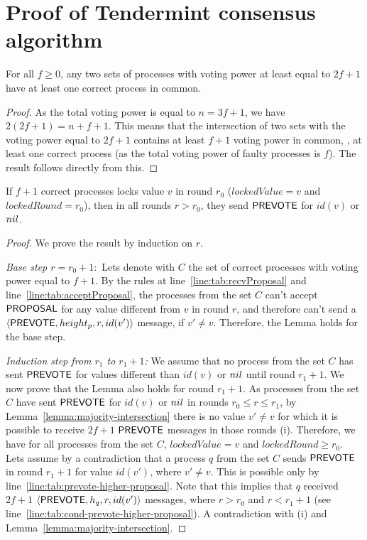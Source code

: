 \section{Proof of Tendermint consensus algorithm}
\label{sec:proof}

\begin{lemma}
	\label{lemma:majority-intersection}
	For all $f\geq 0$, any two sets of processes with voting power at least equal to $2f+1$ have
	at least one correct process in common.
\end{lemma}

\begin{proof}
	As the total voting power is equal to $n=3f+1$, we have $2(2f+1) = n+f+1$.
	This means that the intersection of two sets with the voting power equal to $2f+1$ contains at least $f+1$ voting power in common, \ie, at least one correct process (as the total voting power of faulty processes is $f$). The result follows directly from this.
\end{proof}

\begin{lemma}
	\label{lemma:locked-decision_value-prevote-v}
	If $f+1$ correct processes locks value $v$ in round $r_0$ ($lockedValue = v$ and $lockedRound = r_0$), then in all rounds $r > r_0$, they send $\mathsf{PREVOTE}$ for $id(v)$ or $nil$.
\end{lemma}

\begin{proof}
We prove the result by induction on $r$.

\emph{Base step $r = r_0 + 1:$} Lets denote with $C$ the set of correct processes with voting power equal to $f+1$. 
By the rules at line~\ref{line:tab:recvProposal} and line~\ref{line:tab:acceptProposal}, the processes from the set $C$ can't accept $\mathsf{PROPOSAL}$ for any value different from $v$ in round $r$, and therefore can't send a $\langle\mathsf{PREVOTE},height_p, r,id(v')\rangle$ message,
if $v' \neq v$. Therefore, the Lemma holds for the base step.

\emph{Induction step from $r_1$ to $r_1+1$:} We assume that no process from the set $C$ has sent $\mathsf{PREVOTE}$ for values different than $id(v)$ or $nil$ until round $r_1 + 1$. We now prove that 
the Lemma also holds for round $r_1 + 1$. As processes from the set $C$ have sent $\mathsf{PREVOTE}$ for $id(v)$ or $nil$ in rounds $r_0 \le r \le r_1$, by Lemma~\ref{lemma:majority-intersection}
there is no value $v' \neq v$ for which it is possible to receive $2f+1$ $\mathsf{PREVOTE}$ messages in those rounds (i). Therefore, we have for all processes from the set $C$, $lockedValue = v$ and $lockedRound \ge r_0$.   
Lets assume by a contradiction that a process $q$ from the set $C$ sends $\mathsf{PREVOTE}$ in round $r_1 + 1$ for value $id(v')$, where $v' \neq v$. This is possible only by line~\ref{line:tab:prevote-higher-proposal}. 
Note that this implies that $q$ received $2f+1$ $\langle\mathsf{PREVOTE},h_q, r,id(v')\rangle$ messages, where $r > r_0$ and $r < r_1 +1$ (see line~\ref{line:tab:cond-prevote-higher-proposal}). A contradiction with (i) and Lemma~\ref{lemma:majority-intersection}.  	
\end{proof}	

